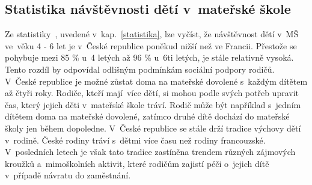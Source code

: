 			\subsection{Statistika návštěvnosti dětí v mateřské škole}
		
				Ze statistiky~\cite{Eurydice}, uvedené v kap.~\ref{statistika}, lze vyčíst, že návštěvnost dětí v~MŠ ve věku 4 - 6 let je v~České republice poněkud nižší než ve Francii. Přestože se pohybuje mezi 85 \% u~4 letých až 96 \% u~6ti letých, je stále relativně vysoká. Tento rozdíl by odpovídal odlišným podmínkám sociální podpory rodičů. V České republice je možné zůstat doma na mateřské dovolené s každým dítětem až čtyři roky. Rodiče, kteří mají více dětí, si mohou podle svých potřeb upravit čas, který jejich děti v mateřské škole tráví. Rodič může být například s~jedním dítětem doma na mateřské dovolené, zatímco druhé dítě dochází do mateřské školy jen během dopoledne. V České republice se stále drží tradice výchovy dětí v rodině. České rodiny tráví s~dětmi více času než rodiny francouzské. V posledních letech je však tato tradice zastíněna trendem různých zájmových kroužků a~mimoškolních aktivit, které rodičům zajistí péči o~jejich dítě v~případě návratu do zaměstnání.  


				
	

